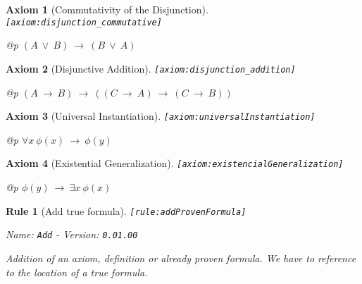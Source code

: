 \documentclass[a4paper,german,10pt,twoside]{book}
\newtheorem{ax}{Axiom}
\newtheorem{rul}{Rule}
\theoremstyle{definition}
\theoremstyle{remark}
\begin{document}
\begin{ax}[Commutativity of the Disjunction]
\label{axiom:disjunction_commutative} \hypertarget{axiom:disjunction_commutative}{}
{\tt \tiny [\verb]axiom:disjunction_commutative]]}
\mbox{}
\begin{longtable}{{@{\extracolsep{\fill}}p{\linewidth}}}
\centering $(A\ \lor\ B)\ \rightarrow\ (B\ \lor\ A)$
\end{longtable}

\end{ax}


\begin{ax}[Disjunctive Addition]
\label{axiom:disjunction_addition} \hypertarget{axiom:disjunction_addition}{}
{\tt \tiny [\verb]axiom:disjunction_addition]]}
\mbox{}
\begin{longtable}{{@{\extracolsep{\fill}}p{\linewidth}}}
\centering $(A\ \rightarrow\ B)\ \rightarrow\ ((C\ \rightarrow\ A)\ \rightarrow\ (C\ \rightarrow\ B))$
\end{longtable}

\end{ax}


\begin{ax}[Universal Instantiation]
\label{axiom:universalInstantiation} \hypertarget{axiom:universalInstantiation}{}
{\tt \tiny [\verb]axiom:universalInstantiation]]}
\mbox{}
\begin{longtable}{{@{\extracolsep{\fill}}p{\linewidth}}}
\centering $\forall x\ \phi(x)\ \rightarrow\ \phi(y)$
\end{longtable}

\end{ax}


\begin{ax}[Existential Generalization]
\label{axiom:existencialGeneralization} \hypertarget{axiom:existencialGeneralization}{}
{\tt \tiny [\verb]axiom:existencialGeneralization]]}
\mbox{}
\begin{longtable}{{@{\extracolsep{\fill}}p{\linewidth}}}
\centering $\phi(y)\ \rightarrow\ \exists x\ \phi(x)$
\end{longtable}

\end{ax}


\begin{rul}[Add true formula]
\label{rule:addProvenFormula} \hypertarget{rule:addProvenFormula}{}
{\tt \tiny [\verb]rule:addProvenFormula]]}

\par
{\em   Name: \verb]Add]  -  Version: \verb]0.01.00]}


Addition of an axiom, definition or already proven formula. We have to reference to the location of a true formula.
\end{rul}
\end{document}
